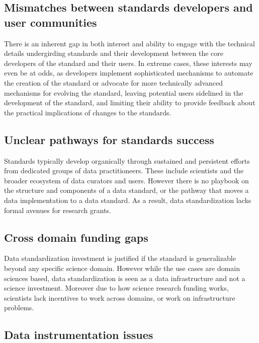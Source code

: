 \documentclass[
  letterpaper,
  DIV=11,
  numbers=noendperiod]{scrartcl}
\begin{document}
\subsection{Mismatches between standards developers and user
communities}\label{mismatches-between-standards-developers-and-user-communities}

There is an inherent gap in both interest and ability to engage with the
technical details undergirding standards and their development between
the core developers of the standard and their users. In extreme cases,
these interests may even be at odds, as developers implement
sophisticated mechanisms to automate the creation of the standard or
advocate for more technically advanced mechanisms for evolving the
standard, leaving potential users sidelined in the development of the
standard, and limiting their ability to provide feedback about the
practical implications of changes to the standards.

\subsection{Unclear pathways for standards
success}\label{unclear-pathways-for-standards-success}

Standards typically develop organically through sustained and persistent
efforts from dedicated groups of data practitioneers. These include
scientists and the broader ecosystem of data curators and users. However
there is no playbook on the structure and components of a data standard,
or the pathway that moves a data implementation to a data standard. As a
result, data standardization lacks formal avenues for research grants.

\subsection{Cross domain funding gaps}\label{cross-domain-funding-gaps}

Data standardization investment is justified if the standard is
generalizable beyond any specific science domain. However while the use
cases are domain sciences based, data standardization is seen as a data
infrastructure and not a science investment. Moreover due to how science
research funding works, scientists lack incentives to work across
domains, or work on infrastructure problems.

\subsection{Data instrumentation
issues}\label{data-instrumentation-issues}
\end{document}
